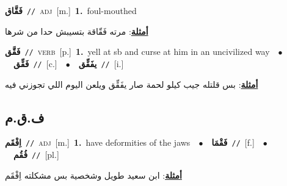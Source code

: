 \documentclass[10pt,a4paper,twoside]{article} %
\begin{document}
\begin{multicols}{2}
{\setlength\topsep{0pt}\textbf{\foreignlanguage{arabic}{فَقَّاق}}\ {\color{gray}\texttt{//}\color{black}}\ \textsc{adj}\ [m.]\ \textbf{1.}~foul-mouthed\  \begin{flushright}\color{gray}\foreignlanguage{arabic}{\textbf{\underline{\foreignlanguage{arabic}{أمثلة}}}: مرته فَقّاقة بتسيبش حدا من شرها}\end{flushright}\color{black}} \vspace{2mm}

{\setlength\topsep{0pt}\textbf{\foreignlanguage{arabic}{فَقَّق}}\ {\color{gray}\texttt{//}\color{black}}\ \textsc{verb}\ [p.]\ \textbf{1.}~yell at sb and curse at him in an uncivilized way\ \ $\bullet$\ \ \setlength\topsep{0pt}\textbf{\foreignlanguage{arabic}{فَقِّق}}\ {\color{gray}\texttt{//}\color{black}}\ [c.]\ \ $\bullet$\ \ \setlength\topsep{0pt}\textbf{\foreignlanguage{arabic}{يفَقِّق}}\ {\color{gray}\texttt{//}\color{black}}\ [i.]\  \begin{flushright}\color{gray}\foreignlanguage{arabic}{\textbf{\underline{\foreignlanguage{arabic}{أمثلة}}}: بس قلتله جيب كيلو لحمة صار يفَقِّق ويلعن اليوم اللي تجوزني فيه}\end{flushright}\color{black}} \vspace{2mm}

\vspace{-3mm}
\subsection*{\color{blue}\foreignlanguage{arabic}{ف.ق.م}\color{blue}{}} 

{\setlength\topsep{0pt}\textbf{\foreignlanguage{arabic}{اِفْقَم}}\ {\color{gray}\texttt{//}\color{black}}\ \textsc{adj}\ [m.]\ \textbf{1.}~have deformities of the jaws\ \ $\bullet$\ \ \setlength\topsep{0pt}\textbf{\foreignlanguage{arabic}{فَقْمَا}}\ {\color{gray}\texttt{//}\color{black}}\ [f.]\ \ $\bullet$\ \ \setlength\topsep{0pt}\textbf{\foreignlanguage{arabic}{فُقُم}}\ {\color{gray}\texttt{//}\color{black}}\ [pl.]\  \begin{flushright}\color{gray}\foreignlanguage{arabic}{\textbf{\underline{\foreignlanguage{arabic}{أمثلة}}}: ابن سعيد طويل وشخصية  بس مشكلته اِفْقَم}\end{flushright}\color{black}} \vspace{2mm}


\end{multicols}
\end{document}
